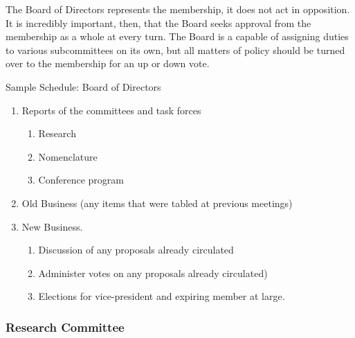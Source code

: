 \begin{refsection}
The Board of Directors represents the membership, it does not act in opposition. It is incredibly important, then, that the Board seeks approval from the membership as a whole at every turn. The Board is a capable of assigning duties to various subcommittees on its own, but all matters of policy should be turned over to the membership for an up or down vote.

\newpage

\begin{apatextbox}{Sample Schedule: Board of Directors}


\begin{enumerate}

\item Reports of the committees and task forces \newline
\begin{enumerate}
\item  Research \newline
\item  Nomenclature \newline
\item  Conference program \newline
\end{enumerate}
\item Old Business (any items that were tabled at previous meetings) \newline
\item  New Business. \newline
\begin{enumerate}
    \item  Discussion of any proposals already circulated \newline
    \item  Administer votes on any proposals already circulated) \newline
    \item  Elections for vice-president and expiring member at large. \newline
\end{enumerate}
\end{enumerate}

\label{sample:bod}
\end{apatextbox}

 

\newpage

\subsubsection{Research Committee}
\label{researchcommittee}


\end{refsection}
